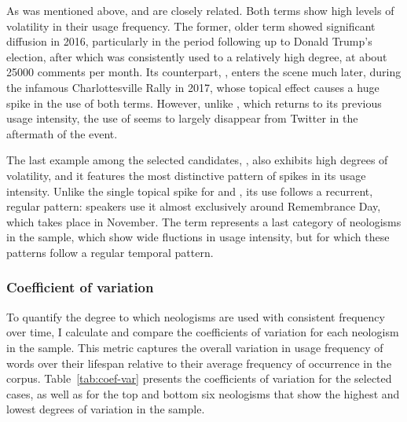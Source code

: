 \documentclass[
  a4paper,
  abstract=on,
  captions=tableabove
  ]{scrartcl}
\begin{document}
         As was mentioned above,  and  are closely related. Both terms show high levels of volatility in their usage frequency. The former, older term showed significant diffusion in 2016, particularly in the period following up to Donald Trump's election, after which  was consistently used to a relatively high degree, at about \num{25000} comments per month. Its counterpart, , enters the scene much later, during the infamous Charlottesville Rally in 2017, whose topical effect causes a huge spike in the use of both terms. However, unlike , which returns to its previous usage intensity, the use of  seems to largely disappear from Twitter in the aftermath of the event.

         The last example among the selected candidates, , also exhibits high degrees of volatility, and it features the most distinctive pattern of spikes in its usage intensity. Unlike the single topical spike for  and , its use follows a recurrent, regular pattern: speakers use it almost exclusively around Remembrance Day, which takes place in November. The term  represents a last category of neologisms in the sample, which show wide fluctions in usage intensity, but for which these patterns follow a regular temporal pattern. 


    \subsubsection{Coefficient of variation}

      To quantify the degree to which neologisms are used with consistent frequency over time, I calculate and compare the coefficients of variation for each neologism in the sample. This metric captures the overall variation in usage frequency of words over their lifespan relative to their average frequency of occurrence in the corpus. Table~\ref{tab:coef-var} presents the coefficients of variation for the selected cases, as well as for the top and bottom six neologisms that show the highest and lowest degrees of variation in the sample.
\end{document}
